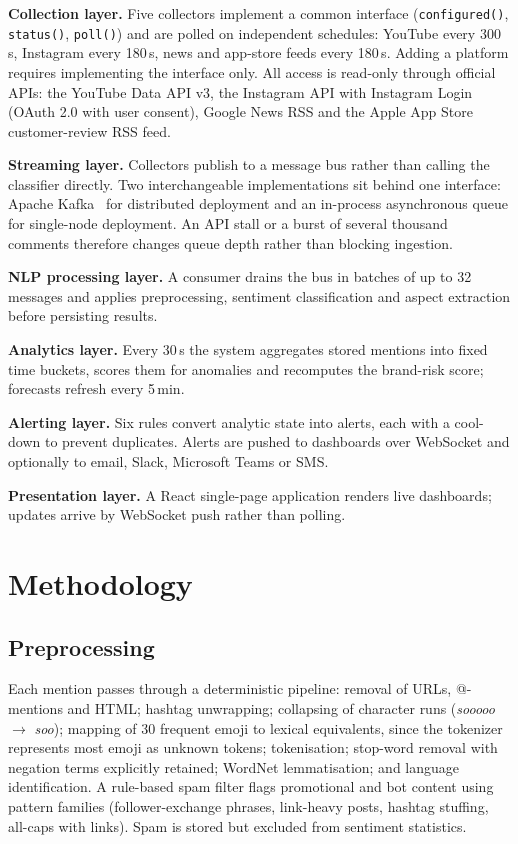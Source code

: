 \documentclass[conference]{IEEEtran}
\begin{document}
\textbf{Collection layer.} Five collectors implement a common interface
(\texttt{configured()}, \texttt{status()}, \texttt{poll()}) and are polled on independent
schedules: YouTube every 300\,s, Instagram every 180\,s, news and app-store feeds every
180\,s. Adding a platform requires implementing the interface only. All access is
read-only through official APIs: the YouTube Data API v3, the Instagram API with
Instagram Login (OAuth 2.0 with user consent), Google News RSS and the Apple App Store
customer-review RSS feed.

\textbf{Streaming layer.} Collectors publish to a message bus rather than calling the
classifier directly. Two interchangeable implementations sit behind one interface: Apache
Kafka~\cite{kreps2011kafka} for distributed deployment and an in-process asynchronous
queue for single-node deployment. An API stall or a burst of several thousand comments
therefore changes queue depth rather than blocking ingestion.

\textbf{NLP processing layer.} A consumer drains the bus in batches of up to 32 messages
and applies preprocessing, sentiment classification and aspect extraction before
persisting results.

\textbf{Analytics layer.} Every 30\,s the system aggregates stored mentions into fixed
time buckets, scores them for anomalies and recomputes the brand-risk score; forecasts
refresh every 5\,min.

\textbf{Alerting layer.} Six rules convert analytic state into alerts, each with a
cool-down to prevent duplicates. Alerts are pushed to dashboards over WebSocket and
optionally to email, Slack, Microsoft Teams or SMS.

\textbf{Presentation layer.} A React single-page application renders live dashboards;
updates arrive by WebSocket push rather than polling.

\section{Methodology}

\subsection{Preprocessing}

Each mention passes through a deterministic pipeline: removal of URLs, @-mentions and
HTML; hashtag unwrapping; collapsing of character runs (\emph{sooooo} $\rightarrow$
\emph{soo}); mapping of 30 frequent emoji to lexical equivalents, since the tokenizer
represents most emoji as unknown tokens; tokenisation; stop-word removal with negation
terms explicitly retained; WordNet lemmatisation; and language identification. A
rule-based spam filter flags promotional and bot content using pattern families
(follower-exchange phrases, link-heavy posts, hashtag stuffing, all-caps with links).
Spam is stored but excluded from sentiment statistics.
\end{document}
